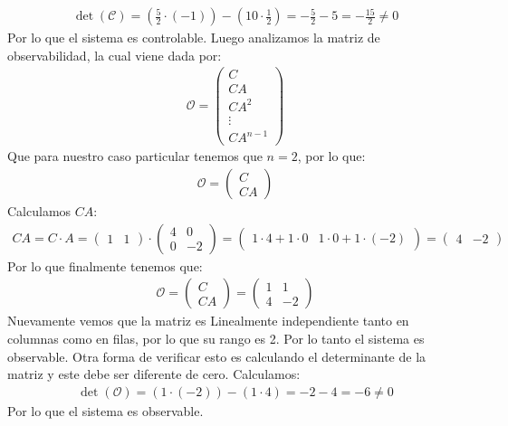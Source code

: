 \documentclass[
  11pt,
  letterpaper,
   addpoints,
  answers
  ]{exam}
\begin{document}
\begin{questions}
\begin{solution}
\begin{align}
  \det(\mathcal C) = \left( \frac{5}{2} \cdot (-1) \right) - (10 \cdot \frac{1}{2}) = -\frac{5}{2} - 5 = -\frac{15}{2} \neq 0
\end{align}
Por lo que el sistema es controlable. Luego analizamos la matriz de observabilidad, la cual viene dada por:
\begin{align}
  \mathcal O = \begin{pmatrix} C \\ CA \\ CA^2 \\ \vdots \\ CA^{n-1} \end{pmatrix}
\end{align}
Que para nuestro caso particular tenemos que $n=2$, por lo que:
\begin{align}
  \mathcal O = \begin{pmatrix} C \\ CA \end{pmatrix}
\end{align}
Calculamos $CA$:
\begin{align}
  CA = C \cdot A = \begin{pmatrix} 1 & 1 \end{pmatrix} \cdot \begin{pmatrix} 4 & 0 \\ 0 & -2 \end{pmatrix} = \begin{pmatrix} 1 \cdot 4 + 1 \cdot 0 & 1 \cdot 0 + 1 \cdot (-2) \end{pmatrix} = \begin{pmatrix} 4 & -2 \end{pmatrix}
\end{align}
Por lo que finalmente tenemos que:
\begin{align}
  \mathcal O = \begin{pmatrix} C \\ CA \end{pmatrix} = \begin{pmatrix} 1 & 1 \\ 4 & -2 \end{pmatrix}
\end{align}
Nuevamente vemos que la matriz es Linealmente independiente tanto en columnas como en filas, por lo que su rango es 2. Por lo tanto el sistema es observable. Otra forma de verificar esto es calculando el determinante de la matriz y este debe ser diferente de cero. Calculamos:
\begin{align}
  \det(\mathcal O) = (1 \cdot (-2)) - (1 \cdot 4) = -2 - 4 = -6 \neq 0
\end{align}
Por lo que el sistema es observable.

\end{solution}
\end{questions}
\end{document}
